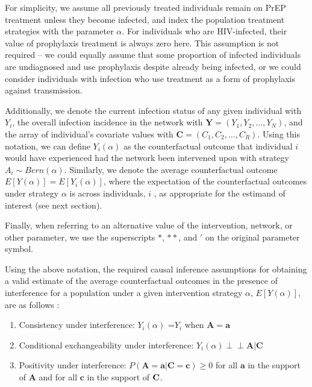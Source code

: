 \documentclass{article}
\theoremstyle{definition}
\newcommand{\indep}{\perp \!\!\! \perp}
\begin{document}
For simplicity, we assume all previously treated individuals remain on PrEP treatment unless they become infected, and index the population treatment strategies with the parameter $\alpha$. For individuals who are HIV-infected, their value of prophylaxis treatment is always zero here. This assumption is not required -- we could equally assume that some proportion of infected individuals are undiagnosed and use prophylaxis despite already being infected, or we could consider individuals with infection who use treatment as a form of prophylaxis against transmission.

Additionally, we denote the current infection status of any given individual with $Y_i$, the overall infection incidence in the network with $\mathbf{Y} = (Y_{1}, Y_{2}, \ldots, Y_{N})$, and the array of individual’s covariate values with  $\mathbf{C} = (C_{1}, C_{2}, \ldots, C_{R})$. Using this notation, we can define $Y_{i}(\alpha)$ as the counterfactual outcome that individual $i$ would have experienced had the network been intervened upon with strategy $A_i \sim Bern(\alpha)$. Similarly, we denote the average counterfactual outcome $E[Y(\alpha)] = E[Y_{i}(\alpha)]$, where the expectation of the counterfactual outcomes under strategy $\alpha$ is across individuals, $i$ , as appropriate for the estimand of interest (see next section).

Finally, when referring to an alternative value of the intervention, network, or other parameter, we use the superscripts $*$, $**$, and $'$ on the original parameter symbol.

Using the above notation, the required causal inference assumptions for obtaining a valid estimate of the average counterfactual outcomes in the presence of interference for a population under a given intervention strategy $\alpha$, $E[Y(\alpha)]$, are as follows \cite{halloran_study_1991, hudgens_toward_2008, ogburn_causal_2014, tchetgen_tchetgen_causal_2012}:


\begin{enumerate}
\item Consistency under interference: $Y_{i}(\alpha)$ =$Y_{i}$ when $\mathbf{A} =\mathbf{a}$
\item 	Conditional exchangeability under interference: $Y_{i}(\alpha) \indep \mathbf{A} |\mathbf{C}$
\item Positivity under interference: $P({\mathbf A}= {\mathbf a} |{\mathbf C} = {\mathbf c}) \ge 0$ for all ${\mathbf a}$ in the support of ${\mathbf A}$ and for all ${\mathbf c}$ in the support of ${\bf C}$.
\end{enumerate}
\end{document}
